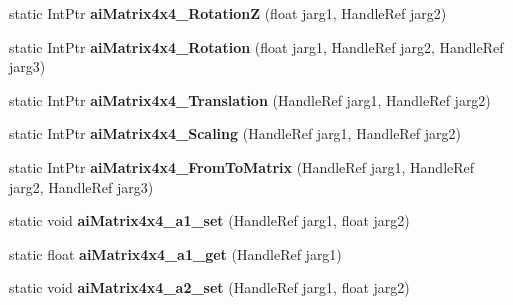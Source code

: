 \begin{DoxyCompactItemize}
\item 
\hypertarget{class_assimp_p_i_n_v_o_k_e_a8841621aca68736f48ed987d7300cb17}{static Int\+Ptr {\bfseries ai\+Matrix4x4\+\_\+\+Rotation\+Z} (float jarg1, Handle\+Ref jarg2)}\label{class_assimp_p_i_n_v_o_k_e_a8841621aca68736f48ed987d7300cb17}

\item 
\hypertarget{class_assimp_p_i_n_v_o_k_e_ac662d18d8a2a949b7e1ee94707d80f2e}{static Int\+Ptr {\bfseries ai\+Matrix4x4\+\_\+\+Rotation} (float jarg1, Handle\+Ref jarg2, Handle\+Ref jarg3)}\label{class_assimp_p_i_n_v_o_k_e_ac662d18d8a2a949b7e1ee94707d80f2e}

\item 
\hypertarget{class_assimp_p_i_n_v_o_k_e_afe1c850cd690dcdbc3506b0cdeafe126}{static Int\+Ptr {\bfseries ai\+Matrix4x4\+\_\+\+Translation} (Handle\+Ref jarg1, Handle\+Ref jarg2)}\label{class_assimp_p_i_n_v_o_k_e_afe1c850cd690dcdbc3506b0cdeafe126}

\item 
\hypertarget{class_assimp_p_i_n_v_o_k_e_ad7bde8ec9ab5b3ff5cda499f7d7062af}{static Int\+Ptr {\bfseries ai\+Matrix4x4\+\_\+\+Scaling} (Handle\+Ref jarg1, Handle\+Ref jarg2)}\label{class_assimp_p_i_n_v_o_k_e_ad7bde8ec9ab5b3ff5cda499f7d7062af}

\item 
\hypertarget{class_assimp_p_i_n_v_o_k_e_a16bdc7ecfdf86668b4a8e79a6a2888e9}{static Int\+Ptr {\bfseries ai\+Matrix4x4\+\_\+\+From\+To\+Matrix} (Handle\+Ref jarg1, Handle\+Ref jarg2, Handle\+Ref jarg3)}\label{class_assimp_p_i_n_v_o_k_e_a16bdc7ecfdf86668b4a8e79a6a2888e9}

\item 
\hypertarget{class_assimp_p_i_n_v_o_k_e_a58b91ca088ed3c3f8ff175d8dcc9f4bc}{static void {\bfseries ai\+Matrix4x4\+\_\+a1\+\_\+set} (Handle\+Ref jarg1, float jarg2)}\label{class_assimp_p_i_n_v_o_k_e_a58b91ca088ed3c3f8ff175d8dcc9f4bc}

\item 
\hypertarget{class_assimp_p_i_n_v_o_k_e_a7af4231b52c1df159e4d6a05d1b35efe}{static float {\bfseries ai\+Matrix4x4\+\_\+a1\+\_\+get} (Handle\+Ref jarg1)}\label{class_assimp_p_i_n_v_o_k_e_a7af4231b52c1df159e4d6a05d1b35efe}

\item 
\hypertarget{class_assimp_p_i_n_v_o_k_e_abe7008e94ac658a973a653bc32c7dec2}{static void {\bfseries ai\+Matrix4x4\+\_\+a2\+\_\+set} (Handle\+Ref jarg1, float jarg2)}\label{class_assimp_p_i_n_v_o_k_e_abe7008e94ac658a973a653bc32c7dec2}


\end{DoxyCompactItemize}
